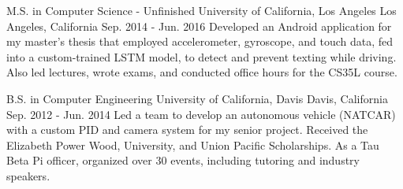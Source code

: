 

\begin{cventries}

  \cventry
    {M.S. in Computer Science - Unfinished} %
    {University of California, Los Angeles} %
    {Los Angeles, California} %
    {Sep. 2014 - Jun. 2016} %
    {Developed an Android application for my master's thesis that employed accelerometer, gyroscope, and touch data, fed into a custom-trained LSTM model, to detect and prevent texting while driving. Also led lectures, wrote exams, and conducted office hours for the CS35L course.} %
    {}

  \cventry
    {B.S. in Computer Engineering} %
    {University of California, Davis} %
    {Davis, California} %
    {Sep. 2012 - Jun. 2014} %
    {Led a team to develop an autonomous vehicle (NATCAR) with a custom PID and camera system for my senior project. Received the Elizabeth Power Wood, University, and Union Pacific Scholarships. As a Tau Beta Pi officer, organized over 30 events, including tutoring and industry speakers.} %
    {}

\end{cventries}
